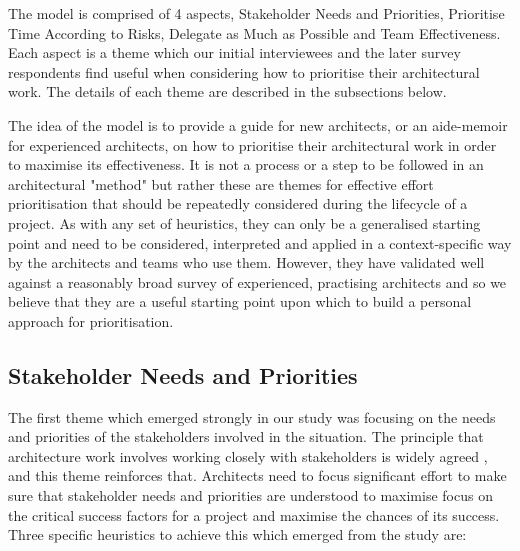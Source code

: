 The model is comprised of 4 aspects, Stakeholder Needs and Priorities, Prioritise Time According to Risks, Delegate as Much as Possible and Team Effectiveness.  Each aspect is a theme which our initial interviewees and the later survey respondents find useful when considering how to prioritise their architectural work.  The details of each theme are described in the subsections below. 

The idea of the model is to provide a guide for new architects, or an aide-memoir for experienced architects, on how to prioritise their architectural work in order to maximise its effectiveness.  It is not a process or a step to be followed in an architectural "method" but rather these are themes for effective effort prioritisation that should be repeatedly considered during the lifecycle of a project.
As with any set of heuristics, they can only be a generalised starting point and need to be considered, interpreted and applied in a context-specific way by the architects and teams who use them.  However, they have validated well against a reasonably broad survey of experienced, practising architects and so we believe that they are a useful starting point upon which to build a personal approach for prioritisation.

\subsection{Stakeholder Needs and Priorities}

The first theme which emerged strongly in our study was focusing on the needs and priorities of the stakeholders involved in the situation.  The principle that architecture work involves working closely with stakeholders is widely agreed \cite{rozanski2011-ssa2e, bass2012-sainp}, and this theme reinforces that. Architects need to focus significant effort to make sure that stakeholder needs and priorities are understood to maximise focus on the critical success factors for a project and maximise the chances of its success.  Three specific heuristics to achieve this which emerged from the study are:


